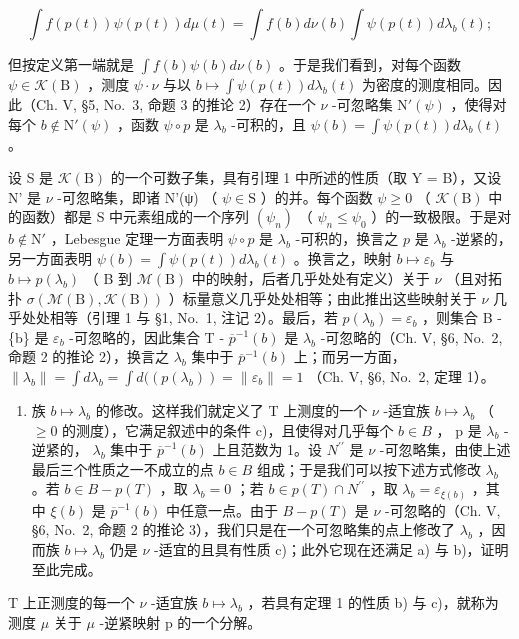 \[
\int f (p (t)) \psi (p (t)) d \mu (t) = \int f (b) d \nu (b) \int \psi (p (t)) d \lambda_ {b} (t);
\]

但按定义第一端就是 \(\int f(b)\psi (b)d\nu (b)\) 。于是我们看到，对每个函数 \(\psi \in \mathcal{K}(\mathrm{B})\) ，测度 \(\psi \cdot \nu\) 与以 \(b\mapsto \int \psi (p(t))d\lambda_b(t)\) 为密度的测度相同。因此（Ch. V, §5, No.~3, 命题 3 的推论 2）存在一个 \(\nu\) -可忽略集 \(\mathrm{N}'(\psi)\) ，使得对每个 \(b\notin \mathrm{N}'(\psi)\) ，函数 \(\psi \circ p\) 是 \(\lambda_{b}\) -可积的，且 \(\psi (b) = \int \psi (p(t))d\lambda_b(t)\) 。

设 S 是 \(\mathcal{K}(\mathrm{B})\) 的一个可数子集，具有引理 1 中所述的性质（取 Y = B），又设 N' 是 \(\nu\) -可忽略集，即诸 N'(ψ) （ \(\psi \in \mathrm{S}\) ）的并。每个函数 \(\psi \geqslant 0\) （ \(\mathcal{K}(\mathrm{B})\) 中的函数）都是 S 中元素组成的一个序列 \((\psi_n)\) （ \(\psi_n \leqslant \psi_0\) ）的一致极限。于是对 \(b \notin \mathrm{N}'\) ，Lebesgue 定理一方面表明 \(\psi \circ p\) 是 \(\lambda_b\) -可积的，换言之 \(p\) 是 \(\lambda_b\) -逆紧的，另一方面表明 \(\psi(b) = \int \psi(p(t)) d\lambda_b(t)\) 。换言之，映射 \(b \mapsto \varepsilon_b\) 与 \(b \mapsto p(\lambda_b)\) （ B 到 \(\mathcal{M}(\mathrm{B})\) 中的映射，后者几乎处处有定义）关于 \(\nu\) （且对拓扑 \(\sigma(\mathcal{M}(\mathrm{B}), \mathcal{K}(\mathrm{B}))\) ）标量意义几乎处处相等；由此推出这些映射关于 \(\nu\) 几乎处处相等（引理 1 与 §1, No.~1, 注记 2）。最后，若 \(p(\lambda_b) = \varepsilon_b\) ，则集合 B - \{b\} 是 \(\varepsilon_b\) -可忽略的，因此集合 T - \(\overline{p}^{-1}(b)\) 是 \(\lambda_b\) -可忽略的（Ch. V, §6, No.~2, 命题 2 的推论 2），换言之 \(\lambda_b\) 集中于 \(\overline{p}^{-1} (b)\) 上；而另一方面， \(\| \lambda_b\| = \int d\lambda_b = \int d((p(\lambda_b)) = \| \varepsilon_b\| = 1\) （Ch. V, §6, No.~2, 定理 1）。

\begin{enumerate}
\def\labelenumi{\arabic{enumi})}
\setcounter{enumi}{4}
\tightlist
\item
  族 \(b \mapsto \lambda_{b}\) 的修改。这样我们就定义了 T 上测度的一个 \(\nu\) -适宜族 \(b \mapsto \lambda_{b}\) （ \(\geqslant 0\) 的测度），它满足叙述中的条件 c)，且使得对几乎每个 \(b \in B\) ， p 是 \(\lambda_{b}\) -逆紧的， \(\lambda_{b}\) 集中于 \(\overline{p}^{-1}(b)\) 上且范数为 1。设 \(N^{\prime\prime}\) 是 \(\nu\) -可忽略集，由使上述最后三个性质之一不成立的点 \(b \in B\) 组成；于是我们可以按下述方式修改 \(\lambda_{b}\) 。若 \(b \in B - p(T)\) ，取 \(\lambda_{b} = 0\) ；若 \(b \in p(T) \cap N^{\prime\prime}\) ，取 \(\lambda_{b} = \varepsilon_{\xi(b)}\) ，其中 \(\xi(b)\) 是 \(\overline{p}^{-1}(b)\) 中任意一点。由于 \(B - p(T)\) 是 \(\nu\) -可忽略的（Ch. V, §6, No.~2, 命题 2 的推论 3），我们只是在一个可忽略集的点上修改了 \(\lambda_{b}\) ，因而族 \(b \mapsto \lambda_{b}\) 仍是 \(\nu\) -适宜的且具有性质 c)；此外它现在还满足 a) 与 b)，证明至此完成。
\end{enumerate}

T 上正测度的每一个 \(\nu\) -适宜族 \(b \mapsto \lambda_{b}\) ，若具有定理 1 的性质 b) 与 c)，就称为测度 \(\mu\) 关于 \(\mu\) -逆紧映射 p 的一个分解。

